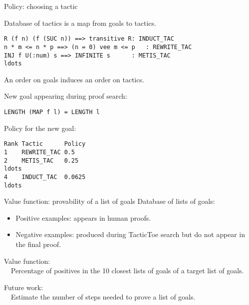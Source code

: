 \documentclass{beamer}
\def\tactictoe{\textsf{TacticToe}\xspace}
\begin{document}
\begin{frame}[fragile]{Policy: choosing a tactic}

Database of tactics is a map from goals to tactics.
\begin{lstlisting}[language=SMLSmall]
R (f n) (f (SUC n)) ==> transitive R: INDUCT_TAC
n * m <= n * p ==> (n = 0) vee m <= p   : REWRITE_TAC
INJ f U(:num) s ==> INFINITE s      : METIS_TAC
ldots
\end{lstlisting}
An order on goals induces an order on tactics.

\vspace{10mm}


New goal appearing during proof search:
\begin{lstlisting}[language=SMLSmall]
LENGTH (MAP f l) = LENGTH l
\end{lstlisting}

Policy for the new goal:
\begin{lstlisting}[language=SMLSmall]
Rank Tactic      Policy
1    REWRITE_TAC 0.5 
2    METIS_TAC   0.25
ldots 
4    INDUCT_TAC  0.0625
ldots
\end{lstlisting}
\end{frame}

\begin{frame}{Value function: provability of a list of goals}
Database of lists of goals:\\
\begin{itemize}
\item Positive examples: appears in human proofs.
\item Negative examples: produced during \tactictoe search but do not appear in 
the final proof.
\end{itemize}

Value function:\\
\ \ Percentage of positives in the 10 closest lists of goals of a target list 
of goals. 

\vspace{5mm}

Future work:\\
\ \ Estimate the number of steps needed to prove a list of goals.

\end{frame}
\end{document}
